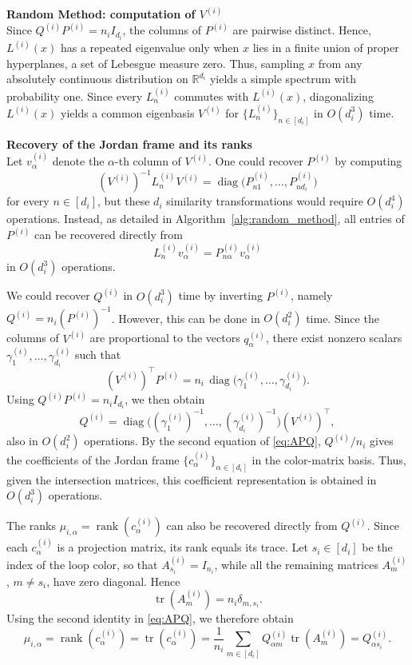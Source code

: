 \documentclass[12pt]{amsart}
\theoremstyle{plain}
\theoremstyle{definition}
\theoremstyle{remark}
\newcommand{\R}{\mathbb{R}}
\newcommand{\1}{\mathbf{1}}
\newcommand{\tr}{\operatorname{tr}}
\begin{document}
\noindent\textbf{Random Method: computation of \(V^{(i)}\)}\\
Since \(Q^{(i)}P^{(i)}=n_iI_{d_i}\), the columns of \(P^{(i)}\) are pairwise distinct. Hence, $L^{(i)}(x)$ has a repeated eigenvalue only when
$x$ lies in a finite union of proper hyperplanes,
a set of Lebesgue measure zero. Thus, sampling \(x\) from any absolutely continuous distribution on \(\R^{d_i}\) yields a simple spectrum with probability one. Since every \(L_n^{(i)}\) commutes with \(L^{(i)}(x)\), diagonalizing \(L^{(i)}(x)\) yields a common eigenbasis \(V^{(i)}\) for \(\{L_n^{(i)}\}_{n\in[d_i]}\) in $O(d_i^3)$ time.


\noindent\textbf{Recovery of the Jordan frame and its ranks}\\
Let \(v_\alpha^{(i)}\) denote the \(\alpha\)-th column of \(V^{(i)}\). One could recover \(P^{(i)}\) by computing
\[
(V^{(i)})^{-1}L_n^{(i)}V^{(i)}
=
\operatorname{diag}\bigl(P_{n1}^{(i)},\ldots,P_{nd_i}^{(i)}\bigr)
\]
for every \(n\in[d_i]\), but these \(d_i\) similarity transformations would require \(O(d_i^4)\) operations. Instead, as detailed in Algorithm~\ref{alg:random_method}, all entries of \(P^{(i)}\) can be recovered directly from
\[
L_n^{(i)}v_\alpha^{(i)}
=
P_{n\alpha}^{(i)}v_\alpha^{(i)}
\]
in \(O(d_i^3)\) operations.

We could recover \(Q^{(i)}\) in \(O(d_i^3)\) time by inverting \(P^{(i)}\), namely \(Q^{(i)}=n_i(P^{(i)})^{-1}\). However, this can be done in \(O(d_i^2)\) time. Since the
columns of \(V^{(i)}\) are proportional to the vectors
\(q_\alpha^{(i)}\), there exist nonzero scalars
\(\gamma_1^{(i)},\ldots,\gamma_{d_i}^{(i)}\) such that
\[
(V^{(i)})^\top P^{(i)}
=n_i\,\operatorname{diag}\bigl(\gamma_1^{(i)},\ldots,
\gamma_{d_i}^{(i)}\bigr).
\]
Using \(Q^{(i)}P^{(i)}=n_iI_{d_i}\), we then obtain
\[
Q^{(i)}
=\operatorname{diag}\bigl((\gamma_1^{(i)})^{-1},\ldots,
(\gamma_{d_i}^{(i)})^{-1}\bigr)(V^{(i)})^\top,
\]
also in \(O(d_i^2)\) operations. By the second equation of
\eqref{eq:APQ}, \(Q^{(i)}/n_i\) gives the coefficients of the Jordan frame
\(\{c_\alpha^{(i)}\}_{\alpha\in[d_i]}\) in the color-matrix basis.
Thus, given the intersection matrices, this coefficient representation
is obtained in \(O(d_i^3)\) operations.

\smallskip
The ranks $\mu_{i,\alpha}=\operatorname{rank}(c_\alpha^{(i)})$ can also be recovered directly from $Q^{(i)}$. Since each $c_\alpha^{(i)}$ is a projection matrix, its rank equals its trace. Let $s_i\in[d_i]$ be the index of the loop color, so that $A_{s_i}^{(i)}=I_{n_i}$, while all the remaining matrices $A_m^{(i)}$, $m\neq s_i$, have zero diagonal. Hence
\[
\tr(A_m^{(i)})=n_i\delta_{m,s_i}.
\]
Using the second identity in \eqref{eq:APQ}, we therefore obtain
\[
\mu_{i,\alpha}
=\operatorname{rank}(c_\alpha^{(i)})
=\tr(c_\alpha^{(i)})
=\frac1{n_i}\sum_{m\in[d_i]}Q_{\alpha m}^{(i)}\tr(A_m^{(i)})
=Q_{\alpha s_i}^{(i)}.
\]
\end{document}
